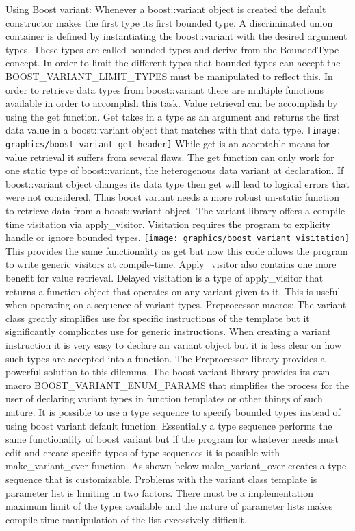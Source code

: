 \documentclass[letterpaper, 12pt]{article}
\begin{document}
	Using Boost variant:
	Whenever a boost::variant object is created the default constructor makes the first type its first bounded type.
	A discriminated union container is defined by instantiating the boost::variant with the desired argument types.
	These types are called bounded types and derive from the BoundedType concept. In order to limit the different
	types that bounded types can accept the BOOST_VARIANT_LIMIT_TYPES must be manipulated to reflect this. 
	In order to retrieve data types from boost::variant there are multiple functions available in order to accomplish this task.
	Value retrieval can be accomplish by using the get function. Get takes in a type as an argument and returns the first 
	data value in a boost::variant object that matches with that data type.
	\texttt{[image: graphics/boost\_variant\_get\_header]}
	While get is an acceptable means for value retrieval it suffers from several flaws. The get function can only work for one
	static type of boost::variant, the heterogenous data variant at declaration. If boost::variant object changes its data type
	then get will lead to logical errors that were not considered. Thus boost variant needs a more robust un-static function 
	to retrieve data from a boost::variant object. The variant library offers a compile-time visitation via apply_visitor. 
	Visitation requires the program to explicity handle or ignore bounded types. 
	\texttt{[image: graphics/boost\_variant\_visitation]}
	This provides the same functionality as get but now this code allows the program to write generic visitors at compile-time.
	Apply_visitor also contains one more benefit for value retrieval. Delayed visitation is a type of apply_visitor that returns
	a function object that operates on any variant given to it. This is useful when operating on a sequence of variant types.
	Preprocessor macros:
	The variant class greatly simplifies use for specific instructions of the template but it significantly complicates use for
	generic instructions. When creating a variant instruction it is very easy to declare an variant object but it is less clear
	on how such types are accepted into a function. The Preprocessor library provides a powerful solution to this dilemma.
	The boost variant library provides its own macro BOOST_VARIANT_ENUM_PARAMS that simplifies the process for the user of 			declaring variant types in function templates or other things of such nature. 
	It is possible to use a type sequence to specify bounded types instead of using boost variant default function. Essentially a 
	type sequence performs the same functionality of boost variant but if the program for whatever needs must edit and create 			specific types of type sequences it is possible with make_variant_over function. As shown below make_variant_over creates a 		type sequence that is customizable. Problems with the variant class template is parameter list is limiting in two factors. There 			must be a implementation maximum limit of the types available and the nature of parameter lists makes compile-time 				manipulation of the list excessively difficult.
\end{document}
